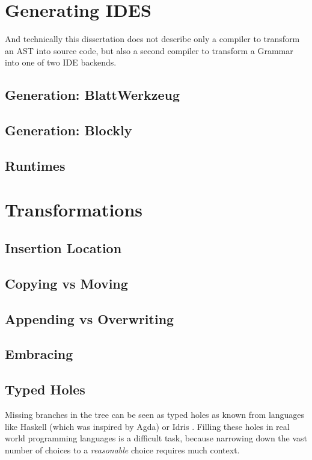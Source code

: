 \section{Generating IDES}

And technically this dissertation does not describe only a compiler to transform an AST into source code, but also a second compiler to transform a Grammar into one of two IDE backends.

\subsection{Generation: BlattWerkzeug}

\subsection{Generation: Blockly}

\subsection{Runtimes}

\section{Transformations}

\subsection{Insertion Location}

\subsection{Copying vs Moving}

\subsection{Appending vs Overwriting}

\subsection{Embracing}

\subsection{Typed Holes}

Missing branches in the tree can be seen as typed holes as known from languages like Haskell (which was inspired by Agda) \cite{jones_haskell_2014} or Idris \cite{brady_type-driven_2017}. Filling these holes in real world programming languages is a difficult task, because narrowing down the vast number of choices to a \textit{reasonable} choice requires much context.

